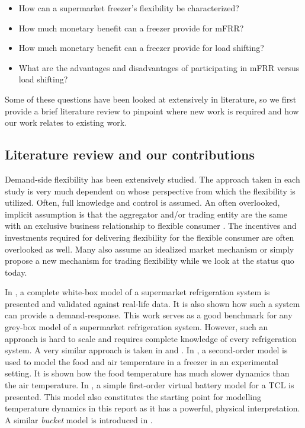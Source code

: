 \begin{itemize}
    \item How can a supermarket freezer's flexibility be characterized?
    \item How much monetary benefit can a freezer provide for mFRR?
    \item How much monetary benefit can a freezer provide for load shifting?
    \item What are the advantages and disadvantages of participating in mFRR versus load shifting?
\end{itemize}

Some of these questions have been looked at extensively in literature, so we first provide a brief literature review to pinpoint where new work is required and how our work relates to existing work.

\subsection{Literature review and our contributions}

Demand-side flexibility has been extensively studied. The approach taken in each study is very much dependent on whose perspective from which the flexibility is utilized. Often, full knowledge and control is assumed. An often overlooked, implicit assumption is that the aggregator and/or trading entity are the same with an exclusive business relationship to flexible consumer \cite{gade2022ecosystem}. The incentives and investments required for delivering flexibility for the flexible consumer are often overlooked as well. Many also assume an idealized market mechanism or simply propose a new mechanism for trading flexibility while we look at the status quo today.

In \cite{shafiei2013modeling}, a complete white-box model of a supermarket refrigeration system is presented and validated against real-life data. It is also shown how such a system can provide a demand-response. This work serves as a good benchmark for any grey-box model of a supermarket refrigeration system. However, such an approach is hard to scale and requires complete knowledge of every refrigeration system. A very similar approach is taken in \cite{petersen2012eso2} and \cite{pedersen2013direct}. In \cite{pedersen2016improving}, a second-order model is used to model the food and air temperature in a freezer in an experimental setting. It is shown how the food temperature has much slower dynamics than the air temperature. In \cite{hao2014aggregate}, a simple first-order virtual battery model for a TCL is presented. This model also constitutes the starting point for modelling temperature dynamics in this report as it has a powerful, physical interpretation. A similar \textit{bucket} model is introduced in \cite{petersen2013taxonomy}.

